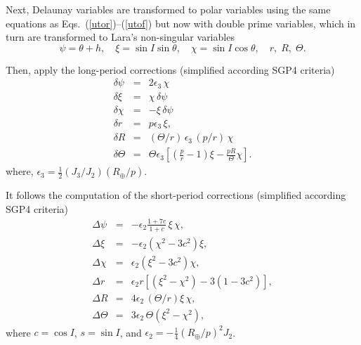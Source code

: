 \documentclass{article}
\begin{document}
Next, Delaunay variables are transformed to polar variables using the same equations as Eqs.~(\ref{utor})--(\ref{utof}) but now with double prime variables, which in turn are transformed to Lara's non-singular variables
\[
\psi=\theta+h,\quad \xi=\sin{I}\sin\theta,\quad \chi=\sin{I}\cos\theta,\quad r,\; R,\; \Theta.
\]

Then, apply the long-period corrections (simplified according SGP4 criteria)
\begin{eqnarray*} \label{dyns}
\delta\psi &=& 2\epsilon_3\,\chi
\\  \label{dxins}
\delta\xi &=&  %
\chi\,\delta\psi
\\ \label{dchins}
\delta\chi &=& %
-\xi\,\delta\psi
\\ \label{drns}
\delta{r} &=& p\epsilon_3\,\xi,
\\ \label{dRRns}
\delta{R} &=& %
(\Theta/r)\,\epsilon_3\,(p/r)\,\chi
\\ \label{dZZns}
\delta\Theta &=& \Theta\epsilon_3\left[\left(\frac{p}{r}-1\right)\xi-\frac{p R}{\Theta}\chi\right].
\end{eqnarray*}
where, $\epsilon_3=\frac{1}{2}(J_3/J_2)(R_\oplus/p)$.
\par

It follows the computation of the short-period corrections (simplified according SGP4 criteria)
\begin{eqnarray*}
\Delta\psi &=& -\epsilon_2\frac{1+7c}{1+c}\,\xi\,\chi,
\\
\Delta\xi &=& -\epsilon_2\left(\chi^2-3c^2\right)\xi,
\\[1ex]
\Delta\chi &=& \epsilon_2\left(\xi^2-3c^2\right)\chi,
\\
\Delta{r} &=& %
\epsilon_2r\left[(\xi^2-\chi^2)-3(1-3c^2)\right],
\\
\Delta{R} &=& %
4\epsilon_2\,(\Theta/r)\xi\,\chi,
\\
\Delta\Theta &=&  3\epsilon_2\,\Theta(\xi^2-\chi^2),
\end{eqnarray*}
where $c=\cos{I}$, $s=\sin{I}$, and $\epsilon_2=-\frac{1}{4}(R_\oplus/p)^2J_2$.
\par
\end{document}

